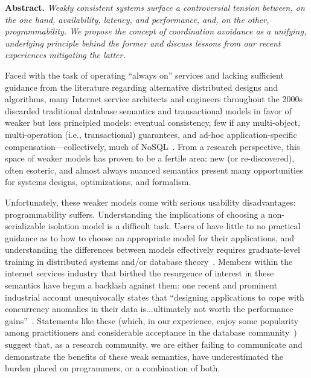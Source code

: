 
\noindent\textbf{Abstract.} \textit{Weakly consistent systems surface a controversial tension between, on the one hand, availability, latency, and performance, and, on the other, programmability. We propose the concept of coordination avoidance as a unifying, underlying principle behind the former and discuss lessons from our recent experiences mitigating the latter.}

 Faced with the task of operating ``always on'' services and lacking sufficient guidance from the literature regarding alternative distributed designs and algorithms, many Internet service architects and engineers throughout the 2000s discarded traditional database semantics and transactional models in favor of weaker but less principled models: eventual consistency, few if any multi-object, multi-operation (i.e., transactional) guarantees, and ad-hoc application-specific compensation---collectively, much of NoSQL~\cite{queue}. From a research perspective, this space of weaker models has proven to be a fertile area: new (or re-discovered), often esoteric, and almost always nuanced semantics present many opportunities for systems designs, optimizations, and formalism.

Unfortunately, these weaker models come with serious usability disadvantages: programmability suffers. Understanding the implications of choosing a non-serializable isolation model is a difficult task. Users of have little to no practical guidance as to how to choose an appropriate model for their applications, and understanding the differences between models effectively requires graduate-level training in distributed systems and/or database theory~\cite{consistency-borders}. Members within the internet services industry that birthed the resurgence of interest in these semantics have begun a backlash against them: one recent and prominent industrial account unequivocally states that ``designing applications to cope with concurrency anomalies in their data is...ultimately not worth the performance gains''~\cite{f1}. Statements like these (which, in our experience, enjoy some popularity among practitioners and considerable acceptance in the database community~\cite{stonebraker-blog}) suggest that, as a research community, we are either failing to communicate and demonstrate the benefits of these weak semantics, have underestimated the burden placed on programmers, or a combination of both.

